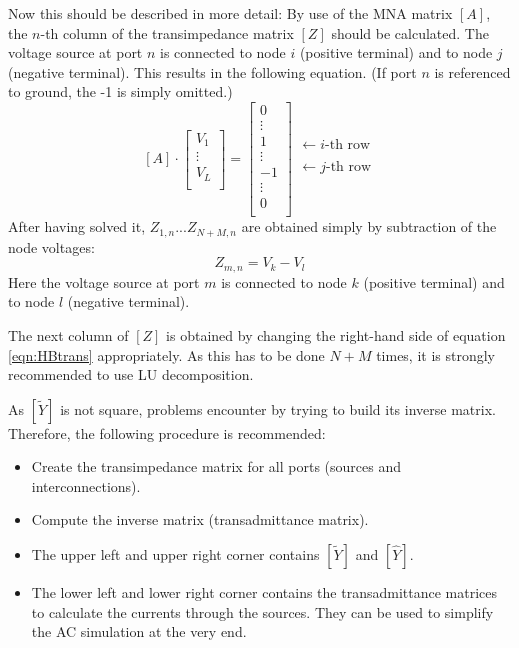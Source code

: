 Now this should be described in more detail: By use of the MNA matrix
$[A]$, the $n$-th column of the transimpedance matrix $[Z]$ should be
calculated. The voltage source at port $n$ is connected to node $i$
(positive terminal) and to node $j$ (negative terminal). This results
in the following equation. (If port $n$ is referenced to ground, the
-1 is simply omitted.)
\begin{equation}
\label{eqn:HBtrans}
[A]\cdot
\begin{bmatrix}
V_1\\
\vdots\\
V_L\\
\end{bmatrix}
=
\begin{bmatrix}
0\\
\vdots\\
1\\
\vdots\\
-1\\
\vdots\\
0\\
\end{bmatrix}
\begin{matrix}
 \\
 \\
\leftarrow i\text{-th row}\\
 \\
\leftarrow j\text{-th row}\\
 \\
 \\
\end{matrix}
\end{equation}
After having solved it, $Z_{1,n}$...$Z_{N+M,n}$ are obtained
simply by subtraction of the node voltages:
\begin{equation}
Z_{m,n} = V_k - V_l
\end{equation}
Here the voltage source at port $m$ is connected to node $k$
(positive terminal) and to node $l$ (negative terminal).

\addvspace{12pt}

The next column of $[Z]$ is obtained by changing the right-hand
side of equation \eqref{eqn:HBtrans} appropriately. As this has to
be done $N+M$ times, it is strongly recommended to use LU
decomposition.

\addvspace{12pt}

As $[\tilde{Y}]$ is not square, problems encounter by trying to
build its inverse matrix. Therefore, the following procedure is
recommended:
\begin{itemize}
\item Create the transimpedance matrix for all ports (sources
  and interconnections).
\item Compute the inverse matrix (transadmittance matrix).
\item The upper left and upper right corner contains $[\tilde{Y}]$
  and $[\hat{Y}]$.
\item The lower left and lower right corner contains the transadmittance
  matrices to calculate the currents through the sources. They
  can be used to simplify the AC simulation at the very end.
\end{itemize}


